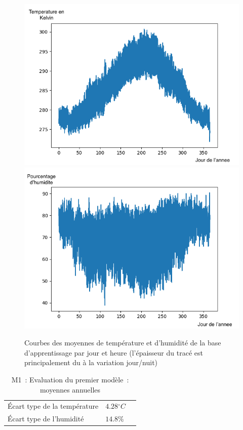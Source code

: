 \documentclass[11pt,a4paper]{article}
\begin{document}
\begin{figure} [!h]
\centering
\includegraphics[width=0.48 \textwidth]{imagesTIPE/moyenneT.png}\quad
\includegraphics[width=0.48 \textwidth]{imagesTIPE/moyenneH.png}
\caption{\label{fig:xxx} Courbes des moyennes de température et d'humidité de la base d'apprentissage par jour et heure (l'épaisseur du tracé est principalement du à la variation jour/nuit)}
\end{figure}
\begin{table}[h]
\begin{center}
\begin{tabular}{lll}\hline
\hline
Écart type de la température& $4.28{}^{\circ}C$\\
Écart type de l'humidité       &  $ 14.8\% $\\
\hline 
\end{tabular}
\caption{M1~: Evaluation du premier modèle~: moyennes annuelles}\label{tab:premModele}
\end{center}
\end{table}
\end{document}
